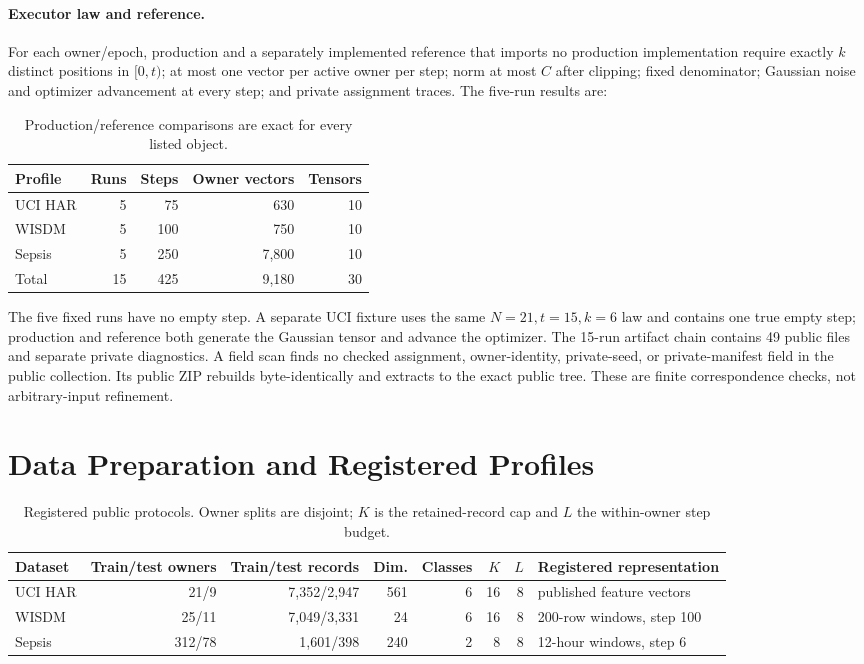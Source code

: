 \documentclass[letterpaper]{article}
\begin{document}
\paragraph{Executor law and reference.}
For each owner/epoch, production and a separately implemented reference that
imports no production implementation require
exactly $k$ distinct positions in $[0,t)$; at most one vector per active owner
per step; norm at most $C$ after clipping; fixed denominator; Gaussian noise
and optimizer advancement at every step; and private assignment traces.  The
five-run results are:

\begin{table}[t]
\centering
\footnotesize
\setlength{\tabcolsep}{4pt}
\begin{tabular}{@{}lrrrr@{}}
\toprule
Profile & Runs & Steps & Owner vectors & Tensors \\
\midrule
UCI HAR & 5 & 75 & 630 & 10 \\
WISDM & 5 & 100 & 750 & 10 \\
Sepsis & 5 & 250 & 7,800 & 10 \\
\midrule
Total & 15 & 425 & 9,180 & 30 \\
\bottomrule
\end{tabular}
\caption{Production/reference comparisons are exact for every listed object.}
\label{tab:supp-a-execution}
\end{table}

The five fixed runs have no empty step.  A separate UCI fixture uses the same
$N=21,t=15,k=6$ law and contains one true empty step; production and reference
both generate the Gaussian tensor and advance the optimizer.  The 15-run
artifact chain contains 49 public files and separate private diagnostics.  A
field scan finds no checked assignment, owner-identity, private-seed, or
private-manifest field in the public collection.  Its public ZIP rebuilds
byte-identically and extracts to the exact public tree.  These are finite
correspondence checks, not arbitrary-input refinement.

\section{Data Preparation and Registered Profiles}

\begin{table}[t]
\centering
\footnotesize
\setlength{\tabcolsep}{4pt}
\begin{tabular}{@{}lrrrrrrl@{}}
\toprule
Dataset & Train/test owners & Train/test records & Dim. & Classes & $K$ & $L$ &
Registered representation \\
\midrule
UCI HAR & 21/9 & 7,352/2,947 & 561 & 6 & 16 & 8 &
published feature vectors \\
WISDM & 25/11 & 7,049/3,331 & 24 & 6 & 16 & 8 &
200-row windows, step 100 \\
Sepsis & 312/78 & 1,601/398 & 240 & 2 & 8 & 8 &
12-hour windows, step 6 \\
\bottomrule
\end{tabular}
\caption{Registered public protocols.  Owner splits are disjoint; $K$ is the
retained-record cap and $L$ the within-owner step budget.}
\label{tab:supp-data}
\end{table}
\end{document}
